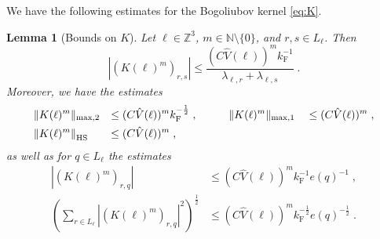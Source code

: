 \documentclass[12pt,a4paper]{article}
\numberwithin{equation}{section}
\newcommand{\1}{\mathbb{I}}
\newcommand{\F}{\mathrm{F}}
\newcommand{\HS}{\mathrm{HS}}
\newcommand{\kF}{k_\F}
\newcommand{\Zstar}{\mathbb{Z}^3} %
\newcommand{\Z}{\mathbb{Z}}
\newcommand{\half}{\frac{1}{2}}
\theoremstyle{plain}
\newtheorem{lemma}[theorem]{Lemma}
\theoremstyle{definition}
\theoremstyle{remark}
\theoremstyle{plain}
\theoremstyle{definition}
\theoremstyle{remark}
\begin{document}
We have the following estimates for the Bogoliubov kernel \eqref{eq:K}.
\begin{lemma}[Bounds on $ K $]\label{lem:normsk}
Let $ \ell \in \Zstar $, $ m \in \mathbb{N} \setminus \{0\}$, and $ r,s \in L_\ell $. Then
\begin{equation} \label{eq:K_element_bounds}
	|(K(\ell)^m)_{r,s}|
	\le \frac{(C \hat{V}(\ell))^m \kF^{-1}}{\lambda_{\ell,r} + \lambda_{\ell,s}} \;.
\end{equation}
Moreover, we have the estimates
\begin{equation} \label{eq:K_max_bounds}
\begin{aligned}
	&\Vert K(\ell)^m \Vert_{\max,2}
	&\le \; &(C \hat{V}(\ell))^m \kF^{-\half} \;, \qquad
	&&\Vert K(\ell)^m \Vert_{\max,1}
	&&\le (C \hat{V}(\ell))^m \;, \\
	&\norm{K(\ell)^m}_{\HS}
	&\le \; &(C \hat{V}(\ell))^m \;,
\end{aligned} 
\end{equation}
as well as for $ q \in L_\ell $ the estimates
\begin{equation} \label{eq:e(q)_extraction_bounds}
\begin{split}
	|(K(\ell)^m)_{r,q}|
	& \le (C \hat{V}(\ell))^m \kF^{-1} e(q)^{-1} \;, \\
	\left( \sum_{r \in L_\ell} |(K(\ell)^m)_{r,q}|^2 \right)^{\half}
	& \le (C \hat{V}(\ell))^m \kF^{-\half} e(q)^{-\half} \;.
\end{split}
\end{equation}
\end{lemma}
\end{document}
